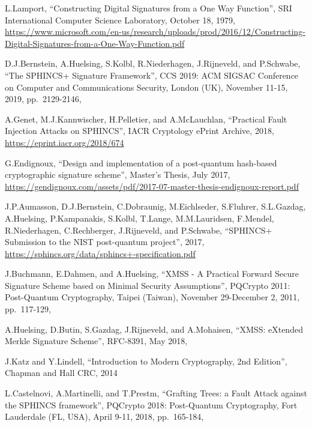 \documentclass[a4paper,12pt]{article}
\def\rfc#1{RFC-#1\xspace}%
\begin{document}
\begin{thebibliography}{99}
L.Lamport,
``Constructing Digital Signatures from a One Way Function'',
SRI International Computer Science Laboratory,
October 18, 1979,
\url{https://www.microsoft.com/en-us/research/uploads/prod/2016/12/Constructing-Digital-Signatures-from-a-One-Way-Function.pdf}

D.J.Bernstein, A.Huelsing, S.Kolbl, R.Niederhagen, J.Rijneveld,  and P.Schwabe,
``The SPHINCS+ Signature Framework'',
CCS 2019: ACM SIGSAC Conference on Computer and Communications Security,
London (UK),
November 11-15, 2019,
pp.~2129-2146,

A.Genet, M.J.Kannwischer, H.Pelletier, and A.McLauchlan,
``Practical Fault Injection Attacks on SPHINCS'',
IACR Cryptology ePrint Archive,
2018,
\url{https://eprint.iacr.org/2018/674}

G.Endignoux,
``Design and implementation of a post-quantum hash-based cryptographic signature scheme'',
Master's Thesis,
July 2017,
\url{https://gendignoux.com/assets/pdf/2017-07-master-thesis-endignoux-report.pdf}

J.P.Aumasson, D.J.Bernstein, C.Dobraunig,
M.Eichlseder, S.Fluhrer, S.L.Gazdag, A.Huelsing,
P.Kampanakis, S.Kolbl, T.Lange, M.M.Lauridsen,
F.Mendel, R.Niederhagen, C.Rechberger, J.Rijneveld,
and P.Schwabe,
``SPHINCS+ Submission to the NIST post-quantum project'',
2017,
\url{https://sphincs.org/data/sphincs+-specification.pdf}

J.Buchmann, E.Dahmen, and A.Huelsing,
``XMSS - A Practical Forward Secure Signature Scheme based on Minimal Security Assumptions'',
PQCrypto 2011: Post-Quantum Cryptography,
Taipei (Taiwan),
November 29-December 2, 2011,
pp.~117-129,

A.Huelsing, D.Butin, S.Gazdag, J.Rijneveld, and A.Mohaisen,
``XMSS: eXtended Merkle Signature Scheme'',
\rfc{8391},
May 2018,

J.Katz and Y.Lindell,
``Introduction to Modern Cryptography, 2nd Edition'',
Chapman and Hall CRC,
2014

L.Castelnovi, A.Martinelli, and T.Prestm,
``Grafting Trees: a Fault Attack against the SPHINCS framework'',
PQCrypto 2018: Post-Quantum Cryptography,
Fort Lauderdale (FL, USA),
April 9-11, 2018,
pp.~165-184,


\end{thebibliography}
\end{document}
